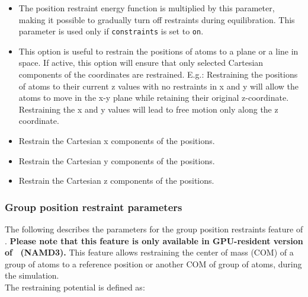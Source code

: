 \begin{itemize}
\item
{}
{The position restraint energy function is multiplied by this parameter,
making it possible to gradually turn off restraints during equilibration.
This parameter is used only if {\tt constraints} is set to 
{\tt on}.}

\item
{}
{This option is useful to restrain the positions of atoms to a plane or a line in space. If active,
 this option will ensure that only selected Cartesian components of the coordinates are restrained.
 E.g.: Restraining the positions of atoms to their current z values with no restraints
 in x and y will allow the atoms to move in the x-y plane while retaining their original z-coordinate.
 Restraining the x and y values will lead to free motion only along the z coordinate.}

\item
{}
{Restrain the Cartesian x components of the positions.}
\item
{}
{Restrain the Cartesian y components of the positions.}
\item
{}
{Restrain the Cartesian z components of the positions.}

\end{itemize}

\subsubsection{Group position restraint parameters}

The following describes the parameters for the group position restraints feature of \NAMD.
{\bf Please note that this feature is only available in GPU-resident version of \NAMD\ (NAMD3).}
This feature allows restraining the center of mass (COM) of a group of atoms to a reference position 
or another COM of group of atoms, during the simulation. \\
The restraining potential is defined as:

